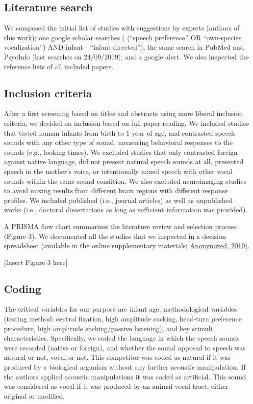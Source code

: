 \documentclass[man]{apa6}
\begin{document}
\subsection{Literature search}\label{literature-search}

We composed the initial list of studies with suggestions by experts
(authors of this work); one google scholar searches ( (\enquote{speech
preference} OR \enquote{own-species vocalization}) AND infant -
\enquote{infant-directed}), the same search in PubMed and PsycInfo (last
searches on 24/09/2019); and a google alert. We also inspected the
reference lists of all included papers.

\subsection{Inclusion criteria}\label{inclusion-criteria}

After a first screening based on titles and abstracts using more liberal
inclusion criteria, we decided on inclusion based on full paper reading.
We included studies that tested human infants from birth to 1 year of
age, and contrasted speech sounds with any other type of sound,
measuring behavioral responses to the sounds (e.g., looking times). We
excluded studies that only contrasted foreign against native language,
did not present natural speech sounds at all, presented speech in the
mother's voice, or intentionally mixed speech with other vocal sounds
within the same sound condition. We also excluded neuroimaging studies
to avoid mixing results from different brain regions with different
response profiles. We included published (i.e., journal articles) as
well as unpublished works (i.e., doctoral dissertations as long as
sufficient information was provided).

A PRISMA flow chart summarizes the literature review and selection
process (Figure 3). We documented all the studies that we inspected in a
decision spreadsheet (available in the online supplementary materials;
\href{https://osf.io/4stz9/?view_only=d0696591ebf34bfc8430f848cd945ca8}{Anonymized,
2019}).

{[}Insert Figure 3 here{]}

\subsection{Coding}\label{coding}

The critical variables for our purpose are infant age, methodological
variables (testing method: central fixation, high amplitude sucking,
head-turn preference procedure, high amplitude sucking/passive
listening), and key stimuli characteristics. Specifically, we coded the
language in which the speech sounds were recorded (native or foreign),
and whether the sound opposed to speech was natural or not, vocal or
not. This competitor was coded as natural if it was produced by a
biological organism without any further acoustic manipulation. If the
authors applied acoustic manipulations it was coded as artificial. This
sound was considered as vocal if it was produced by an animal vocal
tract, either original or modified.
\end{document}

